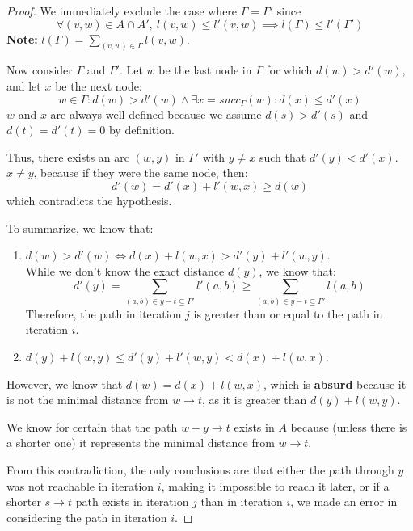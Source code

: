 \begin{proof}
            We immediately exclude the case where \( \Gamma = \Gamma' \) since
            \[
            \forall (v,w) \in A \cap A',\ l(v,w) \le l'(v,w) \implies l(\Gamma) \le l'(\Gamma')
            \]
            \textbf{Note:} \( l(\Gamma) = \sum_{(v,w) \in \Gamma} l(v,w) \).

            Now consider \( \Gamma \) and \( \Gamma' \). Let \( w \) be the last node in \( \Gamma \) for which \( d(w) > d'(w) \), and let \( x \) be the next node:
            \[
            w \in \Gamma : d(w) > d'(w) \land \exists x = succ_{\Gamma}(w) : d(x) \le d'(x)
            \]
            \( w \) and \( x \) are always well defined because we assume \( d(s) > d'(s) \) and \( d(t) = d'(t) = 0 \) by definition.

            Thus, there exists an arc \( (w,y) \) in \( \Gamma' \) with \( y \neq x \) such that \( d'(y) < d'(x) \). \( x \neq y \), because if they were the same node, then:
            \[
            d'(w) = d'(x) + l'(w,x) \ge d(w)
            \]
            which contradicts the hypothesis.

            To summarize, we know that:
            \begin{enumerate}
                \item \( d(w) > d'(w) \iff d(x) + l(w,x) > d'(y) + l'(w,y) \). \\While we don't know the exact distance \( d(y) \), we know that:
            \[
            d'(y) = \sum_{(a,b) \in y-t \subseteq \Gamma'} l'(a,b) \ge \sum_{(a,b) \in y-t \subseteq \Gamma'} l(a,b)
            \]
            Therefore, the path in iteration \( j \) is greater than or equal to the path in iteration \( i \).
                \item \( d(y) + l(w,y) \le d'(y) + l'(w,y) < d(x) + l(w,x) \).
            \end{enumerate}

            However, we know that \( d(w) = d(x) + l(w,x) \), which is \textbf{absurd} because it is not the minimal distance from \( w \rightarrow t \), as it is greater than \( d(y) + l(w,y) \).

            We know for certain that the path \( w-y \rightarrow t \) exists in \( A \) because (unless there is a shorter one) it represents the minimal distance from \( w \rightarrow t \).

            From this contradiction, the only conclusions are that either the path through \( y \) was not reachable in iteration \( i \), making it impossible to reach it later, or if a shorter \( s \rightarrow t \) path exists in iteration \( j \) than in iteration \( i \), we made an error in considering the path in iteration \( i \).


\end{proof}
